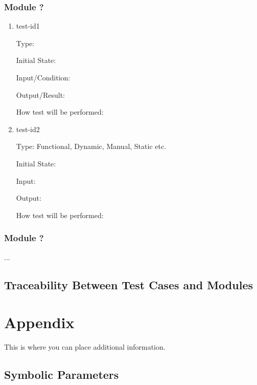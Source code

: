 \documentclass[12pt, titlepage]{article}
\begin{document}
\subsubsection{Module ?}
		
\begin{enumerate}

\item{test-id1\\}

Type: 
					
Initial State: 
					
Input/Condition: 
					
Output/Result: 
					
How test will be performed: 
					
\item{test-id2\\}

Type: Functional, Dynamic, Manual, Static etc.
					
Initial State: 
					
Input: 
					
Output: 
					
How test will be performed: 

\end{enumerate}

\subsubsection{Module ?}

...

\subsection{Traceability Between Test Cases and Modules}

				




\newpage

\section{Appendix}

This is where you can place additional information.

\subsection{Symbolic Parameters}
\end{document}
